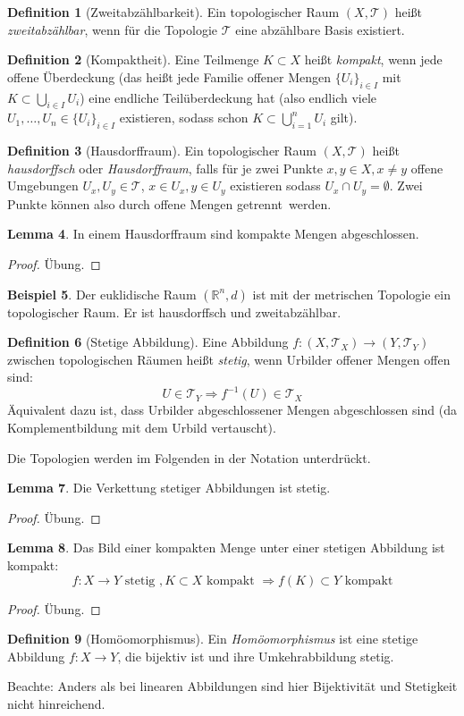 \documentclass[a4paper]{scrbook}
\numberwithin{equation}{chapter}
\newcommand{\R}{\mathbb{R}}
\theoremstyle{definition}
\newtheorem{defn}{Definition}[section]
\newtheorem{lemma}[defn]{Lemma}
\newtheorem{bsp}[defn]{Beispiel}
\newcommand{\bewUeb}{\begin{proof}Übung.\end{proof}}
\begin{document}
		\begin{defn}[Zweitabzählbarkeit]
			Ein topologischer Raum $(X,\mathcal{T})$ heißt \emph{zweitabzählbar}, wenn für die Topologie $\mathcal{T}$ eine abzählbare Basis existiert. 
		\end{defn}
		\begin{defn}[Kompaktheit]
			Eine Teilmenge $K\subset X$ heißt \emph{kompakt}, wenn jede offene Überdeckung (das heißt jede Familie offener Mengen $\lbrace U_i\rbrace_{i\in I}$ mit $K\subset \bigcup_{i\in I}U_i$) eine endliche Teilüberdeckung hat (also endlich viele $U_1,\ldots,U_n\in\lbrace U_i\rbrace_{i\in I}$ existieren, sodass schon $K\subset \bigcup_{i=1}^n U_i$ gilt).
		\end{defn}
		\begin{defn}[Hausdorffraum]
			Ein topologischer Raum $(X,\mathcal{T})$ heißt \emph{hausdorffsch} oder \emph{Hausdorffraum}, falls für je zwei Punkte $x,y\in X, x\neq y$ offene Umgebungen ${U_x,U_y\in\mathcal{T}}$, ${x\in U_x}, {y\in U_y}$ existieren sodass $U_x\cap U_y=\emptyset$. Zwei Punkte können also durch offene Mengen \glqq getrennt\grqq\ werden.
		\end{defn}
		\begin{lemma}
			In einem Hausdorffraum sind kompakte Mengen abgeschlossen.
			\bewUeb
		\end{lemma}
		\begin{bsp}
			Der euklidische Raum $(\R^n,d)$ ist mit der metrischen Topologie ein topologischer Raum. Er ist hausdorffsch und zweitabzählbar.
		\end{bsp}
		\begin{defn}[Stetige Abbildung]
			Eine Abbildung $f\colon (X,\mathcal{T}_X)\rightarrow (Y,\mathcal{T}_Y)$ zwischen topologischen Räumen heißt \emph{stetig}, wenn Urbilder offener Mengen offen sind:
			\begin{equation*}
				U\in\mathcal{T}_Y \Rightarrow f^{-1}(U)\in\mathcal{T}_X
			\end{equation*}
			Äquivalent dazu ist, dass Urbilder abgeschlossener Mengen abgeschlossen sind (da Komplementbildung mit dem Urbild vertauscht).
		\end{defn}
		Die Topologien werden im Folgenden in der Notation unterdrückt.
		\begin{lemma}
			Die Verkettung stetiger Abbildungen ist stetig.
			\bewUeb
		\end{lemma}
		\begin{lemma}
			Das Bild einer kompakten Menge unter einer stetigen Abbildung ist kompakt:
			\begin{equation*}
				f\colon X\rightarrow Y \text{ stetig }, K\subset X \text{ kompakt }\Rightarrow f(K)\subset Y \text{ kompakt}
			\end{equation*}
			\bewUeb
		\end{lemma}
		\begin{defn}[Homöomorphismus]
			Ein \emph{Homöomorphismus} ist eine stetige Abbildung $f\colon X\rightarrow Y$, die bijektiv ist und ihre Umkehrabbildung stetig.
			
			Beachte: Anders als bei linearen Abbildungen sind hier Bijektivität und Stetigkeit nicht hinreichend.
		\end{defn}
\end{document}
